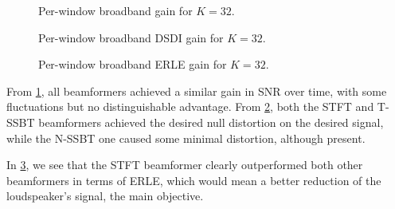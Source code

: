 
\begin{figure}[H]
	\centering
	
	\caption{Per-window broadband gain for $K = 32$.}
	\label{fig:lineplot_gain_32}
\end{figure}
\begin{figure}[H]
	\centering
	
	\caption{Per-window broadband DSDI gain for $K = 32$.}
	\label{fig:lineplot_dsdi_32}
\end{figure}
\begin{figure}[H]
	\centering
	
	\caption{Per-window broadband ERLE gain for $K = 32$.}
	\label{fig:lineplot_erle_32}
\end{figure}

From \cref{fig:lineplot_gain_32}, all beamformers achieved a similar gain in SNR over time, with some fluctuations but no distinguishable advantage. From \cref{fig:lineplot_dsdi_32}, both the STFT and T-SSBT beamformers achieved the desired null distortion on the desired signal, while the N-SSBT one caused some minimal distortion, although present.

In \cref{fig:lineplot_erle_32}, we see that the STFT beamformer clearly outperformed both other beamformers in terms of ERLE, which would mean a better reduction of the loudspeaker's signal, the main objective.





